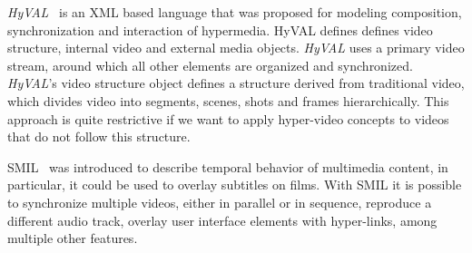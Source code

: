 \documentclass[10pt,conference]{IEEEtran}
\begin{document}
\emph{HyVAL}~\cite{hyval} is an \gls{XML} based language that was proposed for modeling composition, synchronization and interaction of hypermedia. 
HyVAL defines defines video structure, internal video and external media objects. 
\emph{HyVAL} uses a primary video stream, around which all other elements are organized and synchronized.
\emph{HyVAL}'s video structure object defines a structure derived from traditional video, which divides video into segments, scenes, shots and frames hierarchically. 
  This approach is quite restrictive if we want to apply hyper-video concepts to videos that do not follow this structure. 

  \gls{SMIL}~\cite{smil} was introduced to describe temporal behavior of multimedia content, in particular, it could be used to overlay subtitles on films. 
With \gls{SMIL} it is possible to synchronize multiple videos, either in parallel or in sequence, reproduce a different audio track, overlay user interface elements with hyper-links, among multiple other features.




  
\end{document}
